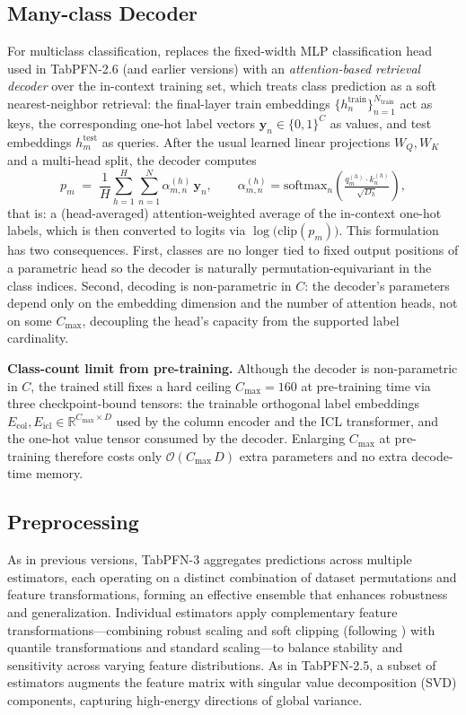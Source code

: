\subsection{Many-class Decoder}
\label{sec:many-class-decoder}
For multiclass classification, \ourmodel replaces the fixed-width MLP classification head used in TabPFN-2.6 (and earlier versions) with an \emph{attention-based retrieval decoder} over the in-context training set,
which treats class prediction as a soft nearest-neighbor retrieval: the final-layer train embeddings $\{h^\mathrm{train}_n\}_{n=1}^{N_\mathrm{train}}$ act as keys, the corresponding one-hot label vectors $\mathbf{y}_n \in \{0,1\}^{C}$ as values, and test embeddings $h^\mathrm{test}_m$ as queries. After the usual learned linear projections $W_Q, W_K$ and a multi-head split, the decoder computes
\[
p_m \;=\; \frac{1}{H}\sum_{h=1}^{H}\sum_{n=1}^{N}
            \alpha^{(h)}_{m,n}\,\mathbf{y}_n,
\qquad
\alpha^{(h)}_{m,n}=\mathrm{softmax}_n\!\left(
            \tfrac{q^{(h)}_m \cdot k^{(h)}_n}{\sqrt{D_h}}\right),
\]
that is: a (head-averaged) attention-weighted average of the in-context one-hot labels, which is then converted to logits via $\log\!\big(\mathrm{clip}(p_m)\big)$. This formulation has two consequences. First, classes are no longer tied to fixed output positions of a parametric head
so the decoder is naturally permutation-equivariant in the class indices.
Second, decoding is non-parametric in $C$: the decoder's parameters depend only on the embedding dimension and the number of attention heads, not on some $C_{\max}$, decoupling the head's capacity from the supported label cardinality.

\textbf{Class-count limit from pre-training.}
Although the decoder is non-parametric in $C$, the trained \ourmodel still fixes a hard ceiling $C_{\max} = 160$ at pre-training time via three checkpoint-bound tensors: the trainable orthogonal label embeddings $E_{\mathrm{col}}, E_{\mathrm{icl}} \in \mathbb{R}^{C_{\max} \times D}$ used by the column encoder and the ICL transformer, and the one-hot value tensor consumed by the decoder. Enlarging $C_{\max}$ at pre-training therefore costs only $\mathcal{O}(C_{\max}\,D)$ extra parameters and no extra decode-time memory.



\subsection{Preprocessing}
\label{sec:preprocessing}

As in previous versions, TabPFN-3 aggregates predictions across multiple estimators, each operating on a distinct combination of dataset permutations and feature transformations, forming an effective ensemble that enhances robustness and generalization. Individual estimators apply complementary feature transformations—combining robust scaling and soft clipping (following \citep{holzmuller2024realmlp}) with quantile transformations and standard scaling—to balance stability and sensitivity across varying feature distributions. As in TabPFN-2.5, a subset of estimators augments the feature matrix with singular value decomposition (SVD) components, capturing high-energy directions of global variance.

